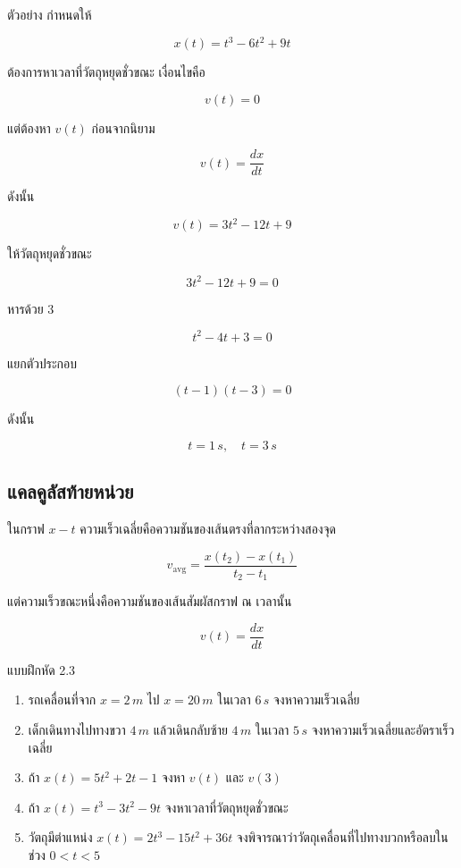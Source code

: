 \documentclass[12pt,a4paper]{report}
\begin{document}
\begin{examplebox}{ตัวอย่าง}
กำหนดให้

\[
x(t)=t^3-6t^2+9t
\]

ต้องการหาเวลาที่วัตถุหยุดชั่วขณะ เงื่อนไขคือ

\[
v(t)=0
\]

แต่ต้องหา $v(t)$ ก่อนจากนิยาม

\[
v(t)=\frac{dx}{dt}
\]

ดังนั้น

\[
v(t)=3t^2-12t+9
\]

ให้วัตถุหยุดชั่วขณะ

\[
3t^2-12t+9=0
\]

หารด้วย $3$

\[
t^2-4t+3=0
\]

แยกตัวประกอบ

\[
(t-1)(t-3)=0
\]

ดังนั้น

\[
t=1\,\si{s},\quad t=3\,\si{s}
\]
\end{examplebox}

\subsection{แคลคูลัสท้ายหน่วย}

ในกราฟ $x-t$ ความเร็วเฉลี่ยคือความชันของเส้นตรงที่ลากระหว่างสองจุด

\[
v_{\text{avg}}=\frac{x(t_2)-x(t_1)}{t_2-t_1}
\]

แต่ความเร็วขณะหนึ่งคือความชันของเส้นสัมผัสกราฟ ณ เวลานั้น

\[
v(t)=\frac{dx}{dt}
\]

\begin{exercisebox}{แบบฝึกหัด 2.3}
\begin{enumerate}
    \item รถเคลื่อนที่จาก $x=2\,\si{m}$ ไป $x=20\,\si{m}$ ในเวลา $6\,\si{s}$ จงหาความเร็วเฉลี่ย
    \item เด็กเดินทางไปทางขวา $4\,\si{m}$ แล้วเดินกลับซ้าย $4\,\si{m}$ ในเวลา $5\,\si{s}$ จงหาความเร็วเฉลี่ยและอัตราเร็วเฉลี่ย
    \item ถ้า $x(t)=5t^2+2t-1$ จงหา $v(t)$ และ $v(3)$
    \item ถ้า $x(t)=t^3-3t^2-9t$ จงหาเวลาที่วัตถุหยุดชั่วขณะ
    \item วัตถุมีตำแหน่ง $x(t)=2t^3-15t^2+36t$ จงพิจารณาว่าวัตถุเคลื่อนที่ไปทางบวกหรือลบในช่วง $0<t<5$
\end{enumerate}
\end{exercisebox}
\end{document}

